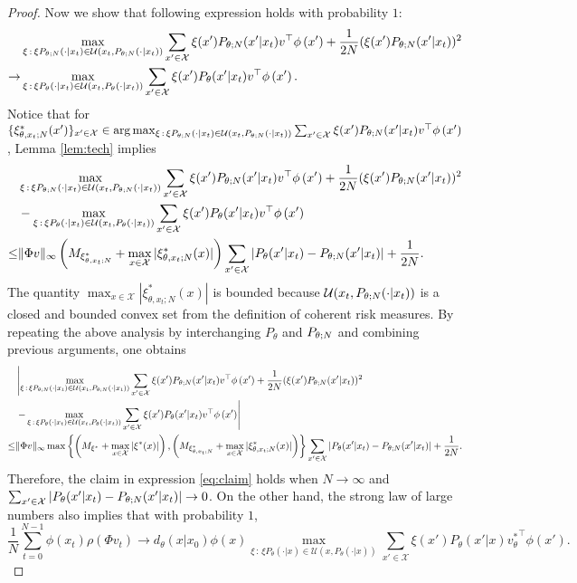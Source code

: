 \begin{proof}
Now we show that following expression holds with probability $1$:
\begin{equation}\label{eq:claim}
\begin{split}
&\max_{\xi\,:\,\xi P_{\theta;N}(\cdot|x_t)\in\mathcal U(x_t,P_{\theta;N}(\cdot|x_t))}\sum_{x'\in\mathcal X}\xi(x') P_{\theta;N}(x'|x_t)v^\top\phi\left(x'\right)+\frac{1}{2N}(\xi(x')P_{\theta;N}(x'|x_t))^2\\
\rightarrow&\max_{\xi\,:\,\xi P_\theta(\cdot|x_t)\in\mathcal U(x_t,P_\theta(\cdot|x_t))}\sum_{x'\in\mathcal X}\xi(x') P_\theta(x'|x_t)v^\top\phi\left(x'\right).
\end{split}
\end{equation}
Notice that for $\{\xi^*_{\theta,x_t;N}(x')\}_{x'\in\mathcal X}\in\arg\max_{\xi\,:\,\xi P_{\theta;N}(\cdot|x_t)\in\mathcal U(x_t,P_{\theta;N}(\cdot|x_t))}\sum_{x'\in\mathcal X}\xi(x') P_{\theta;N}(x'|x_t)v^\top\phi\left(x'\right)$,  Lemma \ref{lem:tech} implies
\[
\begin{split}
&\max_{\xi\,:\,\xi P_{\theta;N}(\cdot|x_t)\in\mathcal U(x_t,P_{\theta;N}(\cdot|x_t))}\sum_{x'\in\mathcal X}\xi(x') P_{\theta;N}(x'|x_t)v^\top\phi\left(x'\right)+\frac{1}{2N}(\xi(x')P_{\theta;N}(x'|x_t))^2\\
&-\max_{\xi\,:\,\xi P_\theta(\cdot|x_t)\in\mathcal U(x_t,P_\theta(\cdot|x_t))}\sum_{x'\in\mathcal X}\xi(x') P_\theta(x'|x_t)v^\top\phi\left(x'\right)\\
\leq & \|\Phi v\|_\infty\left({M}_{\xi^*_{\theta,x_t;N}}+\max_{x\in\mathcal X}|\xi^*_{\theta,x_t;N}(x)|\right)\sum_{x^\prime\in \mathcal X}\left| P_\theta(x^\prime|x_t)-P_{\theta;N}(x^\prime|x_t)\right|+\frac{1}{2N}.
\end{split}
\]
The quantity $\max_{x\in\mathcal X}|\xi^*_{\theta,x_t;N}(x)|$ is bounded because $\mathcal U(x_t,P_{\theta;N}(\cdot|x_t))$ is a closed and bounded convex set from the definition of coherent risk measures. By repeating the above analysis by interchanging $P_\theta$ and $P_{\theta;N}$ and combining previous arguments, one obtains
\[
\begin{split}
& \left|\max_{\xi\,:\,\xi P_{\theta;N}(\cdot|x_t)\in\mathcal U(x_t,P_{\theta;N}(\cdot|x_t))}\sum_{x'\in\mathcal X}\xi(x')P_{\theta;N}(x'|x_t)v^\top\phi\left(x'\right)+\frac{1}{2N}(\xi(x')P_{\theta;N}(x'|x_t))^2\right.\\
&\left.-\max_{\xi\,:\,\xi P_\theta(\cdot|x_t)\in\mathcal U(x_t,P_\theta(\cdot|x_t))}\sum_{x'\in\mathcal X}\xi(x')P_\theta(x'|x_t)v^\top\phi\left(x'\right)\right|\\
\leq & \|\Phi v\|_\infty\max\left\{\left({M}_{\xi^*}+\max_{x\in\mathcal X}|\xi^*(x)|\right),\left({M}_{\xi^*_{\theta,x_t;N}}+\max_{x\in\mathcal X}|\xi^*_{\theta,x_t;N}(x)|\right)\right\}\sum_{x^\prime\in \mathcal X}\left| P_\theta(x^\prime|x_t)-P_{\theta;N}(x^\prime|x_t)\right|+\frac{1}{2N}.
\end{split}
\]
Therefore, the claim in expression \eqref{eq:claim} holds when $N\rightarrow\infty$ and $\sum_{x^\prime\in \mathcal X}\left| P_\theta(x^\prime|x_t)- P_{\theta;N}(x^\prime|x_t)\right|\rightarrow 0$. On the other hand, the strong law of large numbers also implies that with probability $1$,
\[
\frac{1}{N}\sum_{t=0}^{N-1} \phi(x_t)\rho(\Phi v_t)\rightarrow d_\theta(x|x_0)\phi(x)\max_{\xi\,:\,\xi P_\theta(\cdot|x)\in\mathcal U(x,P_\theta(\cdot|x))}\sum_{x'\in\mathcal X}\xi(x') P_\theta(x'|x){v^*_\theta}^\top\phi\left(x'\right).
\]


\end{proof}
